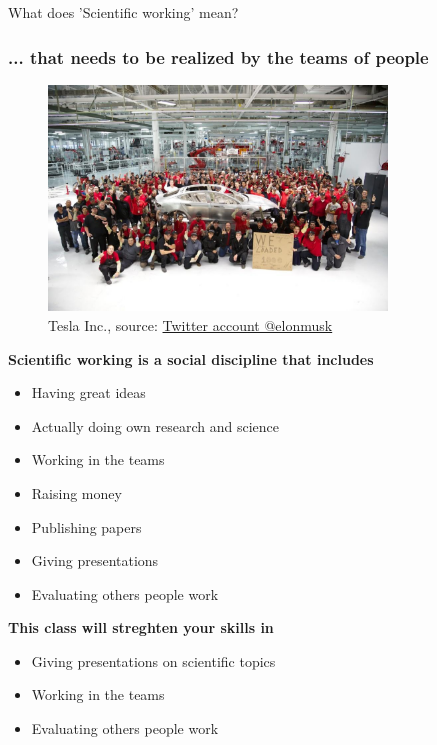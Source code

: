 \begin{frame}{What does 'Scientific working' mean?}
\frametitle{... that needs to be realized by the teams of people}
\begin{figure}
	\includegraphics[width=9cm]{img/teslateam.eps}
	\caption{\textcopyright Tesla Inc., source: \href{https://twitter.com/elonmusk/status/262605962005868544}{Twitter account @elonmusk}}
\end{figure}
\end{frame}

\begin{frame}
\textbf{Scientific working is a social discipline that includes}
\begin{itemize}
\item Having great ideas
\item Actually doing own research and science
\item Working in the teams
\item Raising money
\item Publishing papers
\item Giving presentations
\item Evaluating others people work
\end{itemize}
\textbf{This class will streghten your skills in}
\begin{itemize}
\item Giving presentations on scientific topics
\item Working in the teams
\item Evaluating others people work
\end{itemize}
\end{frame}

